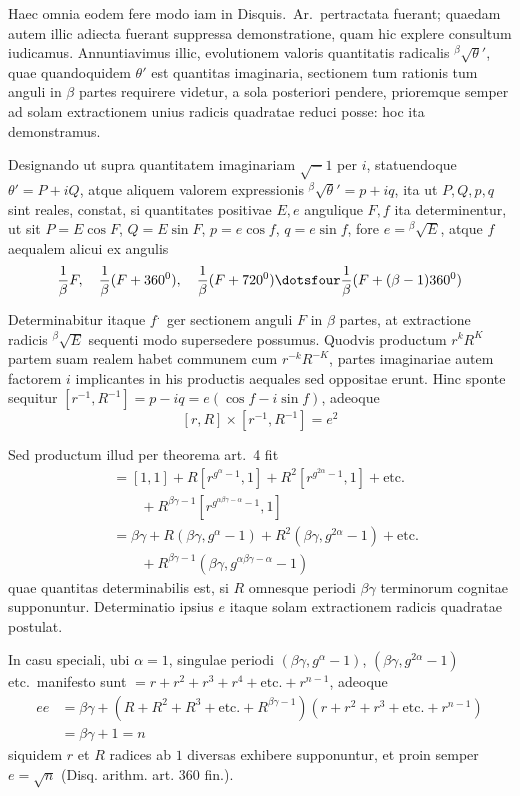 Haec omnia eodem fere modo iam in Disquis.\ Ar.\ pertractata fuerant; quaedam autem illic adiecta fuerant suppressa demonstratione, quam hic explere consultum iudicamus. Annuntiavimus illic, evolutionem valoris quantitatis radicalis ${}^{\beta}\!\surd\theta'$, quae quandoquidem $\theta'$ est quantitas imaginaria, sectionem tum rationis tum anguli in $\beta$ partes requirere videtur, a sola posteriori pendere, prioremque semper ad solam extractionem unius radicis quadratae reduci posse: hoc ita demonstramus.

Designando ut supra quantitatem imaginariam $\surd-1$ per $i$, statuendoque $\theta'=P+iQ$, atque aliquem valorem expressionis ${}^{\beta}\!\surd\theta'=p+iq$, ita ut $P,Q,p,q$ sint reales, constat, si quantitates positivae $E,e$ angulique $F,f$ ita determinentur, ut sit $P=E\cos F$, $Q=E\sin F$, $p=e\cos f$, $q=e\sin f$, fore $e={}^{\beta}\!\surd E$, atque $f$ aequalem alicui ex angulis
\[
\frac1\beta F,\quad\frac1\beta(F+360^0),\quad\frac1\beta(F+720^0)\dotsfour\frac1\beta(F+(\beta-1)360^0)
\]
Determinabitur itaque $f$\textsuperscript{.}\ ger sectionem anguli $F$ in $\beta$ partes, at extractione radicis ${}^{\beta}\!\surd E$ sequenti modo supersedere possumus. Quodvis productum $r^kR^K$ partem suam realem habet communem cum $r^{-k}R^{-K}$, partes imaginariae autem factorem $i$ implicantes in his productis aequales sed oppositae erunt. Hinc sponte sequitur $[r^{-1},R^{-1}]=p-iq=e(\cos f-i\sin f)$, adeoque
\[
[r,R]\times[r^{-1},R^{-1}]=e^2
\]

Sed productum illud per theorema art.\ 4 fit
\[
\begin{aligned}
&{}=[1,1]+R[r^{g^\alpha-1},1]+R^2[r^{g^{2\alpha}-1},1]+\text{etc.}\\
&\qquad{}+R^{\beta\gamma-1}[r^{g^{\alpha\beta\gamma-\alpha}-1},1]\\
&{}=\beta\gamma+R(\beta\gamma,g^\alpha-1)+R^2(\beta\gamma,g^{2\alpha}-1)+\text{etc.}\\
&\qquad{}+R^{\beta\gamma-1}(\beta\gamma,g^{\alpha\beta\gamma-\alpha}-1)
\end{aligned}
\]
quae quantitas determinabilis est, si $R$ omnesque periodi $\beta\gamma$ terminorum cognitae supponuntur. Determinatio ipsius $e$ itaque solam extractionem radicis quadratae postulat.

In casu speciali, ubi $\alpha=1$, singulae periodi $(\beta\gamma,g^\alpha-1)$, $(\beta\gamma,g^{2\alpha}-1)$ etc.\ manifesto sunt $=r+r^2+r^3+r^4+\text{etc.}+r^{n-1}$, adeoque
\[
\begin{aligned}
ee&=\beta\gamma+(R+R^2+R^3+\text{etc.}+R^{\beta\gamma-1})(r+r^2+r^3+\text{etc.}+r^{n-1})\\
&=\beta\gamma+1=n
\end{aligned}
\]
siquidem $r$ et $R$ radices ab $1$ diversas exhibere supponuntur, et proin semper $e=\surd n$ (Disq. arithm. art. 360 fin.).


